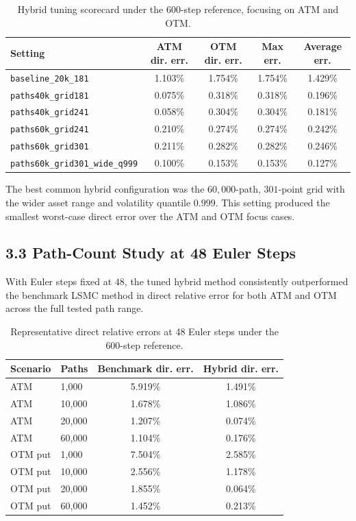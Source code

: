 \documentclass[11pt,a4paper]{article}
\begin{document}
\begin{table}[h!]
\centering
\caption{Hybrid tuning scorecard under the 600-step reference, focusing on ATM and OTM.}
\begin{tabular}{lcccc}
\toprule
Setting & ATM dir. err. & OTM dir. err. & Max err. & Average err. \\
\midrule
\texttt{baseline\_20k\_181} & 1.103\% & 1.754\% & 1.754\% & 1.429\% \\
\texttt{paths40k\_grid181} & 0.075\% & 0.318\% & 0.318\% & 0.196\% \\
\texttt{paths40k\_grid241} & 0.058\% & 0.304\% & 0.304\% & 0.181\% \\
\texttt{paths60k\_grid241} & 0.210\% & 0.274\% & 0.274\% & 0.242\% \\
\texttt{paths60k\_grid301} & 0.211\% & 0.282\% & 0.282\% & 0.246\% \\
\texttt{paths60k\_grid301\_wide\_q999} & 0.100\% & 0.153\% & 0.153\% & 0.127\% \\
\bottomrule
\end{tabular}
\end{table}

The best common hybrid configuration was the \(60{,}000\)-path, \(301\)-point grid with the wider asset range and volatility quantile \(0.999\). This setting produced the smallest worst-case direct error over the ATM and OTM focus cases.

\subsection*{3.3 Path-Count Study at 48 Euler Steps}

With Euler steps fixed at \(48\), the tuned hybrid method consistently outperformed the benchmark LSMC method in direct relative error for both ATM and OTM across the full tested path range.

\begin{table}[h!]
\centering
\caption{Representative direct relative errors at 48 Euler steps under the 600-step reference.}
\begin{tabular}{llcc}
\toprule
Scenario & Paths & Benchmark dir. err. & Hybrid dir. err. \\
\midrule
ATM & 1,000 & 5.919\% & 1.491\% \\
ATM & 10,000 & 1.678\% & 1.086\% \\
ATM & 20,000 & 1.207\% & 0.074\% \\
ATM & 60,000 & 1.104\% & 0.176\% \\
\midrule
OTM put & 1,000 & 7.504\% & 2.585\% \\
OTM put & 10,000 & 2.556\% & 1.178\% \\
OTM put & 20,000 & 1.855\% & 0.064\% \\
OTM put & 60,000 & 1.452\% & 0.213\% \\
\bottomrule
\end{tabular}
\end{table}
\end{document}
